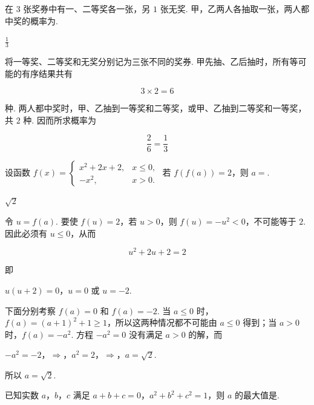\begin{problem}
在 \(3\) 张奖券中有一、二等奖各一张，另 \(1\) 张无奖. 甲，乙两人各抽取一张，两人都中奖的概率为\fillinblank{}.
\end{problem}

\begin{answer}
\(\frac{1}{3}\)
\end{answer}

\begin{solution}
将一等奖、二等奖和无奖分别记为三张不同的奖券. 甲先抽、乙后抽时，所有等可能的有序结果共有

\[
3\times2=6
\]

种. 两人都中奖时，甲、乙抽到一等奖和二等奖，或甲、乙抽到二等奖和一等奖，共 \(2\) 种. 因而所求概率为

\[
\frac{2}{6}=\frac{1}{3}
\]
\end{solution}

\begin{problem}
设函数 \( f(x) = \begin{cases}
x^2 + 2x + 2, & x \leqslant 0,\\
-x^2, & x > 0.
\end{cases} \) 若 \( f(f(a)) = 2 \)，则 \( a = \)\fillinblank{}.
\end{problem}

\begin{answer}
\(\sqrt{2}\)
\end{answer}

\begin{solution}
令 \(u=f(a)\). 要使 \(f(u)=2\)，若 \(u>0\)，则 \(f(u)=-u^{2}<0\)，不可能等于 \(2\). 因此必须有 \(u\leqslant0\)，从而

\[
u^{2}+2u+2=2
\]

即

\(u(u+2)=0\)，\(u=0\text{ 或 }u=-2\).

下面分别考察 \(f(a)=0\) 和 \(f(a)=-2\). 当 \(a\leqslant0\) 时，\(f(a)=(a+1)^{2}+1\geqslant1\)，所以这两种情况都不可能由 \(a\leqslant0\) 得到；当 \(a>0\) 时，\(f(a)=-a^{2}\). 方程 \(-a^{2}=0\) 没有满足 \(a>0\) 的解，而

\(-a^{2}=-2\)，\(\Longrightarrow\)，\(a^{2}=2\)，\(\Longrightarrow\)，\(a=\sqrt{2}\).

所以 \(a=\sqrt{2}\).
\end{solution}

\begin{problem}
已知实数 \(a\)，\(b\)，\(c\) 满足 \(a + b + c = 0\)，\(a^2 + b^2 + c^2 = 1\)，则 \(a\) 的最大值是\fillinblank{}.
\end{problem}

